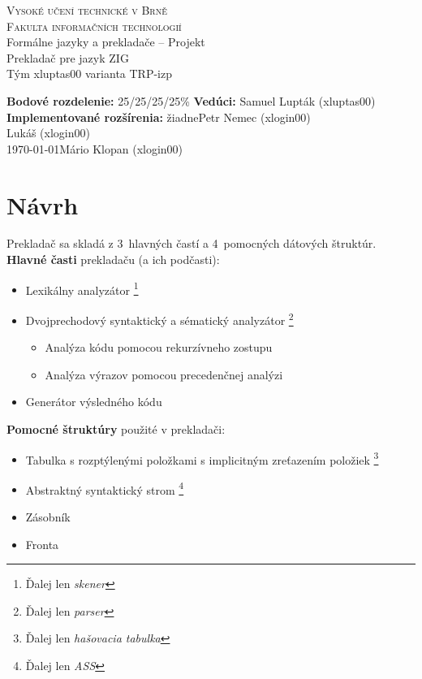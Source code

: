 \documentclass[a4paper, 12pt]{article}
\begin{document}
	\begin{titlepage}
		
		\begin{center}
			\textsc{{\LARGE Vysoké učení technické v Brně \\[0.5em]}  {\LARGE Fakulta informačních technologií}} \\
			{\Large Formálne jazyky a prekladače  -- Projekt \\[0.6em]}
			{\huge Prekladač pre jazyk ZIG} \\[0.6em]
			{\large Tým xluptas00 varianta TRP-izp}
			
		\end{center}
		\begin{flushright}
			{ \textbf{Bodové rozdelenie:} 25/25/25/25\% \hfill \textbf{Vedúci: }Samuel Lupták (xluptas00)} \\
			{ \textbf{Implementované rozšírenia:} žiadne\hfill  Petr Nemec (xlogin00)} \\
			{ \hfill  Lukáš (xlogin00)} \\
			{\today \hfill Mário Klopan (xlogin00)}
		\end{flushright}
		
	\end{titlepage}
	
	\section{Návrh}
	\noindent Prekladač sa skladá z 3~hlavných častí a 4~pomocných dátových štruktúr.\\
	\textbf{Hlavné časti} prekladaču (a ich podčasti):
	\begin{itemize}
		\item Lexikálny analyzátor \footnote[1]{Ďalej len \textit{skener}}
		\item Dvojprechodový syntaktický a sématický analyzátor \footnote[2]{Ďalej len \textit{parser}}
		\begin{itemize} 
			\item Analýza kódu pomocou rekurzívneho zostupu
			\item Analýza výrazov pomocou precedenčnej analýzi 
		\end{itemize}
		\item Generátor výsledného kódu
	\end{itemize}
	
	\noindent\textbf{Pomocné štruktúry} použité v prekladači:
		\begin{itemize}
		\item  Tabulka s rozptýlenými položkami s implicitným zreťazením položiek \footnote[3]{Ďalej len \textit{hašovacia tabulka}}
		\item Abstraktný syntaktický strom \footnote[4]{Ďalej len \textit{ASS}}
		\item Zásobník
		\item Fronta
	\end{itemize}
	
\end{document}
